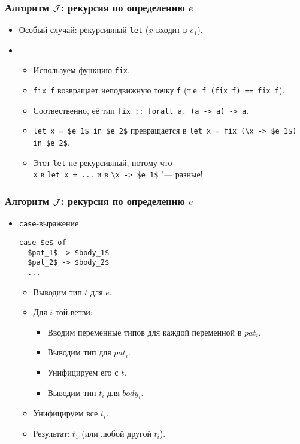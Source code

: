 \documentclass[11pt]{beamer}
\begin{document}
\begin{frame}[fragile]
  \frametitle{Алгоритм $\mathcal{J}$: рекурсия по определению $e$}
  \begin{itemize}
    \item Особый случай: рекурсивный \lstinline|let| ($x$ входит в $e_1$).
          \pause
    \item[]
      \begin{itemize}
        \item Используем функцию \lstinline|fix|.
        \item \lstinline|fix f| возвращает неподвижную точку \lstinline|f| (т.е. \lstinline|f (fix f) == fix f|).
              \pause
        \item Соотвественно, её тип \pause \lstinline|fix :: forall a. (a -> a) -> a|.
              \pause
        \item \lstinline[mathescape]|let x = $e_1$ in $e_2$| превращается в \lstinline[mathescape]|let x = fix (\x -> $e_1$) in $e_2$|.
        \item Этот \lstinline|let| не рекурсивный, потому что
              \pause
              \\ \lstinline|x| в \lstinline|let x = ...| и в \lstinline[mathescape]|\x -> $e_1$| "--- разные!
      \end{itemize}
  \end{itemize}
\end{frame}

\begin{frame}[fragile]
  \frametitle{Алгоритм $\mathcal{J}$: рекурсия по определению $e$}
  \begin{itemize}
    \item \lstinline|case|-выражение
          \begin{lstlisting}[mathescape]
case $e$ of
  $pat_1$ -> $body_1$
  $pat_2$ -> $body_2$
  ...
\end{lstlisting}
          \pause
          \begin{itemize}
            \item Выводим тип $t$ для $e$.
            \item Для $i$-той ветви:
                  \begin{itemize}
                    \pause
                    \item Вводим переменные типов для каждой переменной в $pat_i$.
                    \item Выводим тип для $pat_i$.
                          \pause
                    \item Унифицируем его с $t$.
                          \pause
                    \item Выводим тип $t_i$ для $body_i$.
                  \end{itemize}
                  \pause
            \item Унифицируем все $t_i$.
            \item Результат: \pause $t_1$ (или любой другой $t_i$).
          \end{itemize}
  \end{itemize}
\end{frame}
\end{document}
